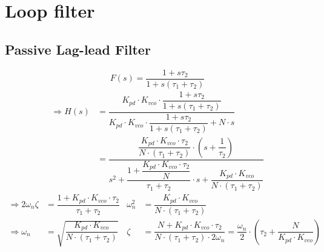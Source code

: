 \section{Loop filter}
\subsection{Passive Lag-lead Filter}
\begin{equation*}
    F(s) = \dfrac{1+s\tau_2}{1+s(\tau_1 + \tau_2)}
\end{equation*}
\begin{align*}
    \Rightarrow H(s) &= \dfrac{K_{pd}\cdot K_{vco}\cdot \dfrac{1+s\tau_2}{1+s(\tau_1 + \tau_2)}}{K_{pd}\cdot K_{vco}\cdot \dfrac{1+s\tau_2}{1+s\left(\tau_1 + \tau_2\right)}+N\cdot s}\\
    &= \dfrac{\dfrac{K_{pd}\cdot K_{vco}\cdot \tau_2}{N\cdot \left(\tau_1 + \tau_2\right)}\cdot \left(s+\dfrac{1}{\tau_2}\right)}{s^2 + \dfrac{1+\dfrac{K_{pd}\cdot K_{vco}\cdot \tau_2}{N}}{\tau_1 + \tau_2}\cdot s + \dfrac{K_{pd}\cdot K_{vco}}{N\cdot \left(\tau_1 + \tau_2\right)}} 
\end{align*}
\begin{align*}
    \Rightarrow 2\omega_n \zeta &= \dfrac{1+K_{pd}\cdot K_{vco}\cdot \tau_2}{\tau_1 +\tau_2} &\omega_n^2 &= \dfrac{K_{pd} \cdot K_{vco}}{N\cdot \left(\tau_1 + \tau_2\right)}\\
    \Rightarrow \omega_n &= \sqrt{\dfrac{K_{pd}\cdot K_{vco}}{N\cdot \left(\tau_1 + \tau_2 \right)}} &\zeta &= \dfrac{N+K_{pd}\cdot K_{vco}\cdot \tau_2}{N\cdot \left(\tau_1 + \tau_2\right) \cdot 2\omega_n} = \dfrac{\omega_n}{2}\cdot \left(\tau_2 + \dfrac{N}{K_{pd}\cdot K_{vco}}\right)
\end{align*}
